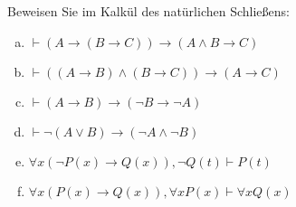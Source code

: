 Beweisen Sie im Kalkül des natürlichen Schließens:
\begin{enumerate}[a)]
  \item $\vdash (A\to(B\to C))\to(A\wedge B\to C)$
  \item $\vdash ((A\to B)\wedge (B\to C))\to(A\to C)$
  \item $\vdash (A\to B)\to(\neg B\to \neg A)$
  \item $\vdash\neg(A\vee B)\to(\neg A\wedge \neg B)$
  \item $\forall x(\neg P(x)\to Q(x)),\neg Q(t)\vdash P(t)$
  \item $\forall x(P(x)\to Q(x)), \forall x P(x)\vdash \forall x Q(x)$
\end{enumerate}




